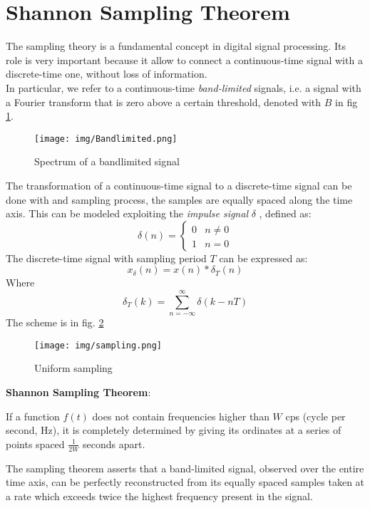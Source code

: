 \section{Shannon Sampling Theorem}
The sampling theory is a fundamental concept in digital signal processing. Its role is very important because it allow to connect a continuous-time signal with a discrete-time one, without loss of information.\\ 
In particular, we refer to a continuous-time \textit{band-limited} signals, i.e. a signal with a Fourier transform that is zero above a certain threshold, denoted with $B$ in fig \ref{fig:bandlimited}.
\begin{figure}[H]\centering
\texttt{[image: img/Bandlimited.png]} 
\caption{Spectrum of a bandlimited signal} \label{fig:bandlimited}
\end{figure}
The transformation of a continuous-time signal to a discrete-time signal can be done with and sampling process, the samples are equally spaced along the time axis. This can be modeled exploiting the \textit{impulse signal} $\delta$ \cite{oppenheim}, defined as:
\begin{equation}
\delta (n) = \begin{cases} 0 &\mbox{} n \neq 0 \\ 
1 & \mbox{} n=0 \end{cases}
\label{eq:deltadirac}
\end{equation}
The discrete-time signal with sampling period $T$ can be expressed as:
\begin{equation}
x_{\delta}(n) = x(n) * \delta_T (n)
\label{eq:convolutionXwithDelta}
\end{equation}
Where
\[\delta_T(k) = \sum_{n=-\infty}^{\infty} \delta (k-nT) \]
The scheme is in fig. \ref{fig:samplingdelta}
\begin{figure}[H]\centering
\texttt{[image: img/sampling.png]} 
\caption{Uniform sampling} \label{fig:samplingdelta}
\end{figure}
\textbf{Shannon Sampling Theorem}:
\begin{theorem}
If a function $f(t)$ does not contain frequencies higher than $W$ cps (cycle per second, Hz), it is completely determined by giving its ordinates at a series of points spaced $\frac{1}{2W}$ seconds apart.
\end{theorem}
The sampling theorem asserts that a band-limited signal, observed over the entire time axis, can be perfectly reconstructed from its equally spaced samples taken at a rate which exceeds twice the highest frequency present in the signal.\\
